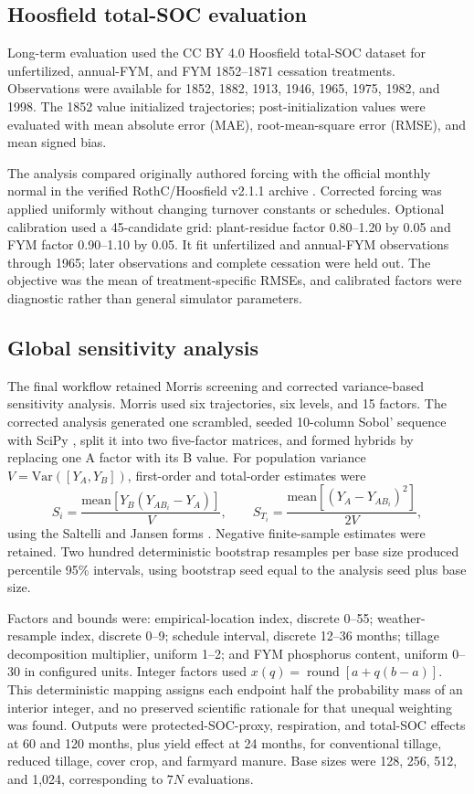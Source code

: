 \documentclass[11pt]{article}
\begin{document}
\subsection{Hoosfield total-SOC evaluation}

Long-term evaluation used the CC BY 4.0 Hoosfield total-SOC dataset \citep{rothamsted2012hoosfieldsoc,perryman2018era} for unfertilized, annual-FYM, and FYM 1852--1871 cessation treatments. Observations were available for 1852, 1882, 1913, 1946, 1965, 1975, 1982, and 1998. The 1852 value initialized trajectories; post-initialization values were evaluated with mean absolute error (MAE), root-mean-square error (RMSE), and mean signed bias.

The analysis compared originally authored forcing with the official monthly normal in the verified RothC/Hoosfield v2.1.1 archive \citep{coleman2025rothc211}. Corrected forcing was applied uniformly without changing turnover constants or schedules. Optional calibration used a 45-candidate grid: plant-residue factor 0.80--1.20 by 0.05 and FYM factor 0.90--1.10 by 0.05. It fit unfertilized and annual-FYM observations through 1965; later observations and complete cessation were held out. The objective was the mean of treatment-specific RMSEs, and calibrated factors were diagnostic rather than general simulator parameters.

\subsection{Global sensitivity analysis}

The final workflow retained Morris screening and corrected variance-based sensitivity analysis. Morris used six trajectories, six levels, and 15 factors. The corrected analysis generated one scrambled, seeded 10-column Sobol' sequence with SciPy \citep{sobol1967distribution,virtanen2020scipy}, split it into two five-factor matrices, and formed hybrids by replacing one A factor with its B value. For population variance $V=\mathrm{Var}([Y_A,Y_B])$, first-order and total-order estimates were
\[
S_i=\frac{\mathrm{mean}[Y_B(Y_{AB_i}-Y_A)]}{V},\qquad
S_{T_i}=\frac{\mathrm{mean}[(Y_A-Y_{AB_i})^2]}{2V},
\]
using the Saltelli and Jansen forms \citep{saltelli2010variance,jansen1999analysis}. Negative finite-sample estimates were retained. Two hundred deterministic bootstrap resamples per base size produced percentile 95\% intervals, using bootstrap seed equal to the analysis seed plus base size.

Factors and bounds were: empirical-location index, discrete 0--55; weather-resample index, discrete 0--9; schedule interval, discrete 12--36 months; tillage decomposition multiplier, uniform 1--2; and FYM phosphorus content, uniform 0--30 in configured units. Integer factors used $x(q)=\operatorname{round}[a+q(b-a)]$. This deterministic mapping assigns each endpoint half the probability mass of an interior integer, and no preserved scientific rationale for that unequal weighting was found. Outputs were protected-SOC-proxy, respiration, and total-SOC effects at 60 and 120 months, plus yield effect at 24 months, for conventional tillage, reduced tillage, cover crop, and farmyard manure. Base sizes were 128, 256, 512, and 1,024, corresponding to $7N$ evaluations.
\end{document}
